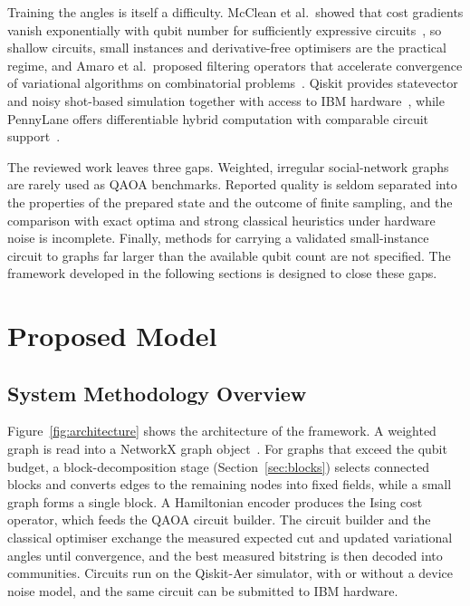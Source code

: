 \documentclass[pdflatex,sn-mathphys-num]{sn-jnl}
\theoremstyle{thmstyleone}
\theoremstyle{thmstyletwo}
\theoremstyle{thmstylethree}
\begin{document}
Training the angles is itself a difficulty. McClean et al.\ showed that cost gradients vanish exponentially with qubit number for sufficiently expressive circuits~\cite{mcclean2018barren}, so shallow circuits, small instances and derivative-free optimisers are the practical regime, and Amaro et al.\ proposed filtering operators that accelerate convergence of variational algorithms on combinatorial problems~\cite{amaro2022filtering}. Qiskit provides statevector and noisy shot-based simulation together with access to IBM hardware~\cite{qiskit2023}, while PennyLane offers differentiable hybrid computation with comparable circuit support~\cite{bergholm2018pennylane}.

The reviewed work leaves three gaps. Weighted, irregular social-network graphs are rarely used as QAOA benchmarks. Reported quality is seldom separated into the properties of the prepared state and the outcome of finite sampling, and the comparison with exact optima and strong classical heuristics under hardware noise is incomplete. Finally, methods for carrying a validated small-instance circuit to graphs far larger than the available qubit count are not specified. The framework developed in the following sections is designed to close these gaps.

\section{Proposed Model}\label{sec:model}

\subsection{System Methodology Overview}\label{sec:overview}

Figure~\ref{fig:architecture} shows the architecture of the framework. A weighted graph is read into a NetworkX graph object~\cite{hagberg2008exploring}. For graphs that exceed the qubit budget, a block-decomposition stage (Section~\ref{sec:blocks}) selects connected blocks and converts edges to the remaining nodes into fixed fields, while a small graph forms a single block. A Hamiltonian encoder produces the Ising cost operator, which feeds the QAOA circuit builder. The circuit builder and the classical optimiser exchange the measured expected cut and updated variational angles until convergence, and the best measured bitstring is then decoded into communities. Circuits run on the Qiskit-Aer simulator, with or without a device noise model, and the same circuit can be submitted to IBM hardware.
\end{document}

